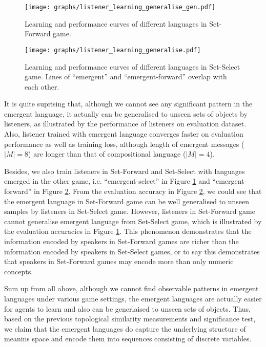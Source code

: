 \begin{figure}[!h]
    \centering
    \texttt{[image: graphs/listener\_learning\_generalise\_gen.pdf]}
    \caption{Learning and performance curves of different languages in Set-Forward game.}
    \label{fig4.0:listener_learning_generalise_gen}
\end{figure}

\begin{figure}[!h]
    \centering
    \texttt{[image: graphs/listener\_learning\_generalise.pdf]}
    \caption{Learning and performance curves of different languages in Set-Select game. Lines of ``emergent'' and ``emergent-forward'' overlap with each other.}
    \label{fig4.00:listener_learning_generalise_ref}
\end{figure}

It is quite suprising that, although we cannot see any significant pattern in the emergent language, it actually can be generalised to unseen sets of objects by listeners, as illustrated by the performance of listeners on evaluation dataset. Also, listener trained with emergent language converges faster on evaluation performance as well as training loss, although length of emergent messages ($|M|=8$) are longer than that of compositional language ($|M|=4$).

Besides, we also train listeners in Set-Forward and Set-Select with languages emerged in the other game, i.e. ``emergent-select'' in Figure \ref{fig4.0:listener_learning_generalise_gen} and ``emergent-forward'' in Figure \ref{fig4.00:listener_learning_generalise_ref}. From the evaluation accuracy in Figure \ref{fig4.00:listener_learning_generalise_ref}, we could see that the emergent language in Set-Forward game can be well generalised to unseen samples by listeners in Set-Select game. However, listeners in Set-Forward game cannot generalise emergent language from Set-Select game, which is illustrated by the evaluation accuracies in Figure \ref{fig4.0:listener_learning_generalise_gen}. This phenomenon demonstrates that the information encoded by speakers in Set-Forward games are richer than the information encoded by speakers in Set-Select games, or to say this demonstrates that speakers in Set-Forward games may encode more than only numeric concepts.

Sum up from all above, although we cannot find observable patterns in emergent languages under various game settings, the emergent languages are actually easier for agents to learn and also can be generlaised to unseen sets of objects. Thus, based on the previous topological similarity measurements and significance test, we claim that the emergent languages do capture the underlying structure of meanins space and encode them into sequences consisting of discrete variables.

